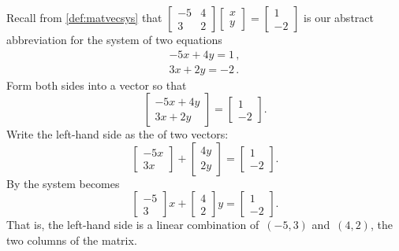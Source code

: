 \begin{example} 
Recall from \autoref{def:matvecsys} that \(\begin{bmatrix} -5&4\\3&2 \end{bmatrix}\begin{bmatrix} x\\y \end{bmatrix}=\begin{bmatrix} 1\\-2 \end{bmatrix}\) is our abstract abbreviation for the system of two equations
\begin{equation*}
\begin{matrix} -5x+4y=1\,,\\ 3x+2y=-2\,. \end{matrix}
\end{equation*}
Form both sides into a vector so that
\begin{equation*}
\begin{bmatrix} -5x+4y\\3x+2y \end{bmatrix}
=\begin{bmatrix} 1\\-2 \end{bmatrix}.
\end{equation*}
Write the left-hand side as the  of two vectors:
\begin{equation*}
\begin{bmatrix} -5x\\3x \end{bmatrix}
+\begin{bmatrix} 4y\\2y \end{bmatrix}
=\begin{bmatrix} 1\\-2 \end{bmatrix}.
\end{equation*}
By  the system becomes
\begin{equation*}
\begin{bmatrix} -5\\3 \end{bmatrix}x
+\begin{bmatrix} 4\\2 \end{bmatrix}y
=\begin{bmatrix} 1\\-2 \end{bmatrix}.
\end{equation*}
That is, the left-hand side is a linear combination of~\((-5,3)\) and~\((4,2)\), the two columns of the matrix.
\end{example}

